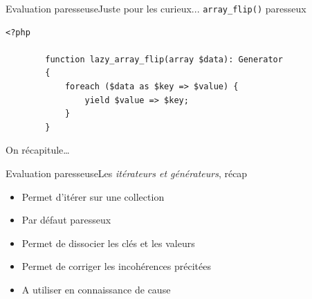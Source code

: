 \begin{frame}[fragile]{Evaluation paresseuse}{Juste pour les curieux... \texttt{array\_flip()} paresseux}
    \begin{lstlisting}[firstnumber=1]
        <?php

        function lazy_array_flip(array $data): Generator
        {
            foreach ($data as $key => $value) {
                yield $value => $key;
            }
        }
    \end{lstlisting}
\end{frame}

\begin{frameC}{On récapitule\ldots}

\end{frameC}

\begin{frame}{Evaluation paresseuse}{Les \textit{itérateurs et générateurs}, récap}
    \begin{itemize}[<+->]
        \item Permet d'itérer sur une collection

        \item Par défaut paresseux

        \item Permet de dissocier les clés et les valeurs

        \item Permet de corriger les incohérences précitées

        \item A utiliser en connaissance de cause
    \end{itemize}
\end{frame}
